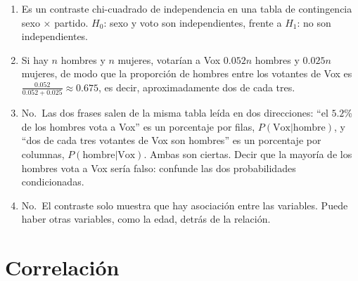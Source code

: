 \documentclass[
  spanish,
  a4paper,
]{scrreport}
\theoremstyle{definition}
\theoremstyle{remark}
\begin{document}
\begin{tcolorbox}[enhanced jigsaw, arc=.35mm, bottomrule=.15mm, bottomtitle=1mm, breakable, colback=white, colbacktitle=quarto-callout-tip-color!10!white, colframe=quarto-callout-tip-color-frame, coltitle=black, left=2mm, leftrule=.75mm, opacityback=0, opacitybacktitle=0.6, rightrule=.15mm, title=\textcolor{quarto-callout-tip-color}{\faLightbulb}\hspace{0.5em}{Solución}, titlerule=0mm, toprule=.15mm, toptitle=1mm]

\begin{enumerate}
\def\labelenumi{\alph{enumi}.}
\item
  Es un contraste chi-cuadrado de independencia en una tabla de
  contingencia sexo × partido. \(H_0\): sexo y voto son independientes,
  frente a \(H_1\): no son independientes.
\item
  Si hay \(n\) hombres y \(n\) mujeres, votarían a Vox \(0.052n\)
  hombres y \(0.025n\) mujeres, de modo que la proporción de hombres
  entre los votantes de Vox es
  \(\frac{0.052}{0.052+0.025}\approx 0.675\), es decir, aproximadamente
  dos de cada tres.
\item
  No.~Las dos frases salen de la misma tabla leída en dos direcciones:
  ``el \(5.2\)\% de los hombres vota a Vox'' es un porcentaje por filas,
  \(P(\text{Vox}|\text{hombre})\), y ``dos de cada tres votantes de Vox
  son hombres'' es un porcentaje por columnas,
  \(P(\text{hombre}|\text{Vox})\). Ambas son ciertas. Decir que la
  mayoría de los hombres vota a Vox sería falso: confunde las dos
  probabilidades condicionadas.
\item
  No.~El contraste solo muestra que hay asociación entre las variables.
  Puede haber otras variables, como la edad, detrás de la relación.
\end{enumerate}

\end{tcolorbox}

\section{Correlación}\label{correlaciuxf3n}
\end{document}
